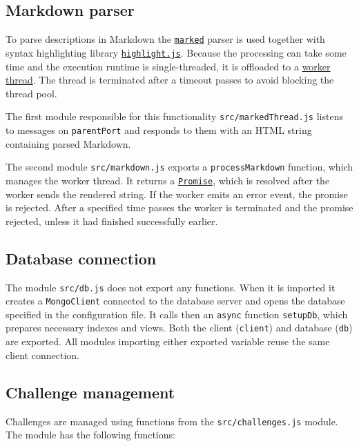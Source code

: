 \subsection{Markdown parser}

To parse descriptions in Markdown the \href{https://marked.js.org/}{\texttt{marked}} parser is used together with syntax highlighting library \href{https://highlightjs.org/}{\texttt{highlight.js}}. Because the processing can take some time and the execution runtime is single-threaded, it is offloaded to a \href{https://nodejs.org/dist/latest-v19.x/docs/api/worker_threads.html}{worker thread}. The thread is terminated after a timeout passes to avoid blocking the thread pool. \cite{bib:event-loop-explained,bib:event-loop-blocking}

The first module responsible for this functionality \texttt{src/markedThread.js} listens to messages on \texttt{parentPort} and responds to them with an HTML string containing parsed Markdown.

The second module \texttt{src/markdown.js} exports a \texttt{processMarkdown} function, which manages the worker thread. It returns a \href{https://tc39.es/ecma262/multipage/control-abstraction-objects.html#sec-promise-objects}{\texttt{Promise}}, which is resolved after the worker sends the rendered string. If the worker emits an error event, the promise is rejected. After a specified time passes the worker is terminated and the promise rejected, unless it had finished successfully earlier.

\subsection{Database connection}

The module \texttt{src/db.js} does not export any functions. When it is imported it creates a \texttt{MongoClient} connected to the database server and opens the database specified in the configuration file. It calls then an \texttt{async} function \texttt{setupDb}, which prepares necessary indexes and views. Both the client (\texttt{client}) and database (\texttt{db}) are exported. All modules importing either exported variable reuse the same client connection.

\subsection{Challenge management}

Challenges are managed using functions from the \texttt{src/challenges.js} module. The module has the following functions:

